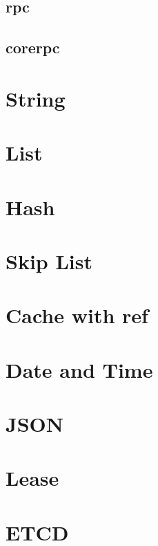 \subsection{rpc}
\subsection{corerpc}

\section{String}
\section{List}
\section{Hash}
\section{Skip List}
\section{Cache with ref}
\section{Date and Time}
\section{JSON}
\section{Lease}
\section{ETCD}
